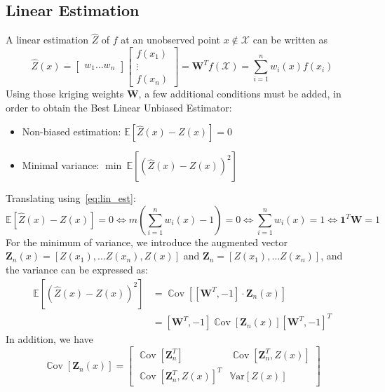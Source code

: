\documentclass[a4paper,11pt]{article}
\newcommand{\Var}{\mathbb{V}\text{ar}}
\newcommand{\Ex}{\mathbb{E}}
\DeclareMathOperator{\Cov}{\mathbb{C}\text{ov}}
\theoremstyle{defi}
\numberwithin{thmCounter}{section}
\begin{document}
\subsection{Linear Estimation}
\label{sec:linear_estimation}
A linear estimation $\hat{Z}$ of $f$ at an unobserved point $x\notin \mathcal{X}$ can be written as
\begin{equation}
  \label{eq:lin_est}
  \hat{Z}(x) =
  \begin{bmatrix}
    w_1 \dots w_n
    \end{bmatrix}
    \begin{bmatrix}
      f(x_1) \\ \vdots \\ f(x_n)
    \end{bmatrix} = \mathbf{W}^Tf(\mathcal{X}) = \sum_{i=1}^n w_i(x) f(x_i)
\end{equation}
Using those kriging weights $\mathbf{W}$, a few additional conditions must be added, in order to obtain the Best Linear Unbiased Estimator:
\begin{itemize}
\item Non-biased estimation: $\Ex[\hat{Z}(x) - Z(x)]=0$
\item Minimal variance: $\min~\Ex[(\hat{Z}(x) - Z(x))^2]$
\end{itemize}
Translating using~\cref{eq:lin_est}:
\begin{equation}
  \Ex[\hat{Z}(x) - Z(x)]=0 \iff m(\sum_{i=1}^n w_i(x)-1) = 0 \iff \sum_{i=1}^n w_i(x) = 1 \iff \mathbf{1}^T \mathbf{W} = 1
\end{equation}
For the minimum of variance, we introduce the augmented vector $\mathbf{Z}_n(x) = [Z(x_1),\dots Z(x_n), Z(x)]$ and $\mathbf{Z}_n = [Z(x_1),\dots Z(x_n)]$, and
the variance can be expressed as:
\begin{align}
  \Ex[(\hat{Z}(x) - Z(x))^2] &= \Cov\left[[\mathbf{W}^T, -1] \cdot \mathbf{Z}_n(x) \right] \\
                             &= [\mathbf{W}^T, -1] \Cov\left[\mathbf{Z}_n(x) \right] [\mathbf{W}^T, -1]^T
\end{align}
In addition, we have
\begin{equation}
  \Cov\left[\mathbf{Z}_n(x) \right] =
  \begin{bmatrix}
    \Cov\left[ \mathbf{Z}_n^T\right]
    & \Cov\left[\mathbf{Z}_n^T, Z(x) \right]
  \\
  \Cov\left[\mathbf{Z}_n^T, Z(x) \right]^T & \Var\left[Z(x)\right]
  \end{bmatrix}
\end{equation}
\end{document}
